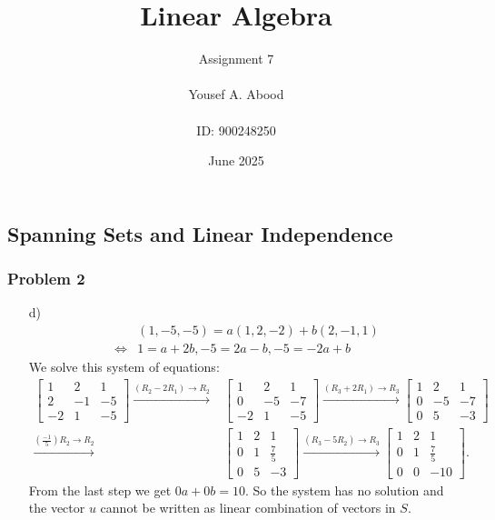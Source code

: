 \documentclass[a4paper,12pt]{article}
\title{Linear Algebra}
\author{Assignment 7\\ \\ Yousef A. Abood\\ \\ ID: 900248250}
\date{June 2025}
\begin{document}
\maketitle
\noindent\makebox[\linewidth]{\rule{15cm}{0.4pt}}

\subsection{Spanning Sets and Linear Independence}

\subsubsection*{Problem 2}
\begin{itemize}
    \item [d)] \begin{align*}
        &(1, -5, -5)= a(1,2,-2)+b(2,-1,1)\\
        \iff& 1=a+2b, -5=2a-b,-5= -2a+b
    \end{align*}
We solve this system of equations:
\begin{align*}
    \begin{bmatrix}
        1&2&1\\
        2&-1&-5\\
        -2&1&-5
    \end{bmatrix} \xrightarrow {{(R_2-2R_1)}\to{R_2}}& \begin{bmatrix}
        1&2&1\\
        0&-5&-7\\
        -2&1&-5
    \end{bmatrix} \xrightarrow{{(R_3+2R_1)}\to{R_3}} \begin{bmatrix}
        1&2&1\\
        0&-5&-7\\
        0&5&-3
    \end{bmatrix}\\ \xrightarrow  {{(\frac{-1}{5})R_2}\to{R_2}}& \begin{bmatrix}
        1&2&1\\
        0&1&\frac{7}{5}\\
        0&5&-3
    \end{bmatrix} \xrightarrow{{(R_3-5R_2)}\to{R_3}} \begin{bmatrix}
        1&2&1\\
        0&1&\frac{7}{5}\\
        0&0&-10
    \end{bmatrix}.
\end{align*}
From the last step we get $0a+0b=10.$ So the system has no solution and the vector $u$ cannot be written as linear combination of vectors in $S.$
\end{itemize}
\end{document}
